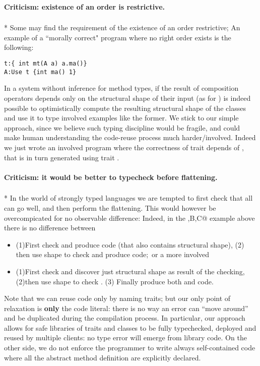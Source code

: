 \paragraph{Criticism: existence of an order is restrictive.}${}_{}$\\*
Some may find the requirement of the existence of an order restrictive;
An example of a ``morally correct" program where no right order exists is the following:
\saveSpace\begin{lstlisting}
t:{ int mt(A a) a.ma()}
A:Use t {int ma() 1}
\end{lstlisting}\saveSpace

In a system without inference for method types,
if the result of composition operators depends only on the
structural shape of their input (as for \use)
is indeed possible to optimistically compute the resulting structural shape of the classes
and use it to type involved examples like the former.
We stick to our simple approach, since we believe such typing discipline would be fragile,
and could make human understanding the code-reuse process much harder/involved.
Indeed we just wrote an involved program where the correctness of trait \Q@t@ depends of 
\Q@A@, that is in turn generated using trait \Q@t@.

\paragraph{Criticism: it would be better to typecheck before flattening.}${}_{}$\\*
In the world of strongly typed languages we are tempted to
first check that all can go well, and then perform the flattening.
This would however be overcompicated for no observable difference:
Indeed, in the \Q@A,B,C@ example above there is no difference
between
\begin{itemize}
\item  (1)First check \Q@B@ and produce \Q@B@ code (that also contains \Q@B@ structural shape),
  (2) then use \Q@B@ shape to check \Q@C@ and produce \Q@C@ code;\ 
or a more involved
\item  (1)First check \Q@B@ and discover just \Q@B@ structural shape as result of the checking,
  (2)then use \Q@B@ shape to check \Q@C@.
  (3) Finally produce both \Q@B@ and \Q@C@ code.
\end{itemize}

Note that we can reuse code only by naming traits; but our only point of relaxation is {\bf only} the code literal: there is no way an error can ``move around'' and be duplicated during the compilation process.
In particular, our approach allows for safe libraries of traits and classes to be fully typechecked, deployed and reused by multiple clients: no type error will emerge from library code.
On the other side, we do not enforce the programmer to write always self-contained code where all the abstract method definition are explicitly declared.
